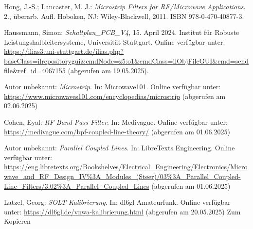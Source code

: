 \begin{thebibliography}{1}
Hong, J.-S.; Lancaster, M. J.: \emph{Microstrip Filters for RF/Microwave Applications}. 2., überarb. Aufl. Hoboken, NJ: Wiley-Blackwell, 2011. ISBN 978-0-470-40877-3.

Haussmann, Simon: \emph{Schaltplan\_PCB\_V4}, 15. April 2024. Institut für Robuste Leistungshalbleitersysteme, Universität Stuttgart. Online verfügbar unter: \url{https://ilias3.uni-stuttgart.de/ilias.php?baseClass=ilrepositorygui&cmdNode=z5:o1&cmdClass=ilObjFileGUI&cmd=sendfile&ref_id=4067155} (abgerufen am 19.05.2025).


Autor unbekannt: \emph{Microstrip}. In: Microwave101. Online verfügbar unter: \url{https://www.microwaves101.com/encyclopedias/microstrip} (abgerufen am 02.06.2025)


Cohen, Eyal: \emph{RF Band Pass Filter}. In: Medivague. Online verfügbar unter: \url{https://medivague.com/bpf-coupled-line-theory/} (abgerufen am 01.06.2025)


Autor unbekannt: \emph{Parallel Coupled Lines}. In: LibreTexts Engineering. Online verfügbar unter: \url{https://eng.libretexts.org/Bookshelves/Electrical_Engineering/Electronics/Microwave_and_RF_Design_IV%3A_Modules_(Steer)/03%3A_Parallel_Coupled-Line_Filters/3.02%3A_Parallel_Coupled_Lines} (abgerufen am 01.06.2025)


Latzel, Georg: \emph{SOLT Kalibrierung}. In: dl6gl Amateurfunk. Online verfügbar unter: \url{https://dl6gl.de/vnwa-kalibrierung.html} (abgerufen am 20.05.2025) Zum Kopieren
  





\end{thebibliography}

\clearpage
